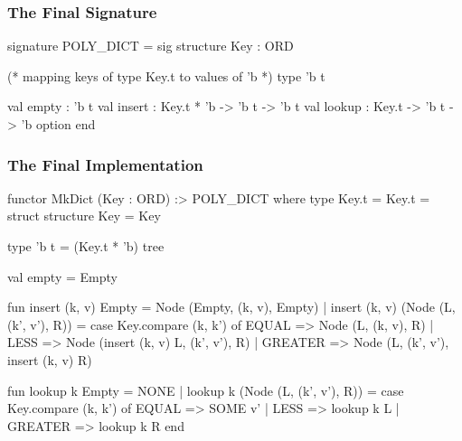 \documentclass[aspectratio=169, handout]{beamer}
\begin{document}
\begin{frame}[fragile]
  \frametitle{The Final Signature}
  \begin{codeblock}
    signature POLY_DICT =
      sig
        structure Key : ORD

        (* mapping keys of type Key.t to values of 'b *)
        type 'b t

        val empty : 'b t
        val insert : Key.t * 'b -> 'b t -> 'b t
        val lookup : Key.t -> 'b t -> 'b option
      end
  \end{codeblock}
\end{frame}
\begin{frame}[fragile]
  \frametitle{The Final Implementation}

  \tiny
  \begin{codeblock}
    functor MkDict (Key : ORD) :>
        POLY_DICT where type Key.t = Key.t =
      struct
        structure Key = Key

        type 'b t = (Key.t * 'b) tree

        val empty = Empty

        fun insert (k, v) Empty = Node (Empty, (k, v), Empty)
          | insert (k, v) (Node (L, (k', v'), R)) =
              case Key.compare (k, k') of
                EQUAL   => Node (L, (k, v), R)
              | LESS    => Node (insert (k, v) L, (k', v'), R)
              | GREATER => Node (L, (k', v'), insert (k, v) R)

        fun lookup k Empty = NONE
          | lookup k (Node (L, (k', v'), R)) =
              case Key.compare (k, k') of
                EQUAL   => SOME v'
              | LESS    => lookup k L
              | GREATER => lookup k R
      end
  \end{codeblock}
\end{frame}



\thankyou

\end{document}
